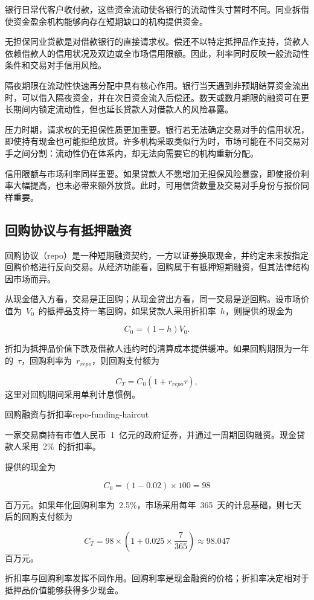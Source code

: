 银行日常代客户收付款，这些资金流动使各银行的流动性头寸暂时不同。同业拆借使资金盈余机构能够向存在短期缺口的机构提供资金。

无担保同业贷款是对借款银行的直接请求权。偿还不以特定抵押品作支持，贷款人依赖借款人的信用状况及双边或全市场信用限额。因此，利率同时反映一般流动性条件和交易对手信用风险。

隔夜期限在流动性快速再分配中具有核心作用。银行当天遇到非预期结算资金流出时，可以借入隔夜资金，并在次日资金流入后偿还。数天或数月期限的融资可在更长期间内锁定流动性，但也延长贷款人对借款人的风险暴露。

压力时期，请求权的无担保性质更加重要。银行若无法确定交易对手的信用状况，即使持有现金也可能拒绝放贷。许多机构采取类似行为时，市场可能在不同交易对手之间分割：流动性仍在体系内，却无法向需要它的机构重新分配。

信用限额与市场利率同样重要。如果贷款人不愿增加无担保风险暴露，即使报价利率大幅提高，也未必带来额外放贷。此时，可用信贷数量及交易对手身份与报价同样重要。

\subsection{回购协议与有抵押融资}

回购协议（repo）是一种短期融资契约，一方以证券换取现金，并约定未来按指定回购价格进行反向交易。从经济功能看，回购属于有抵押短期融资，但其法律结构因市场而异。

从现金借入方看，交易是正回购；从现金贷出方看，同一交易是逆回购。设市场价值为~$V_0$~的抵押品支持一笔回购，如果贷款人采用折扣率~$h$，则提供的现金为

\begin{equation}
C_0=(1-h)V_0.
\label{eq:ch7-repo-cash-haircut}
\end{equation}

折扣为抵押品价值下跌及借款人违约时的清算成本提供缓冲。如果回购期限为一年的~$\tau$，回购利率为~$r_{repo}$，则回购支付额为

\begin{equation}
C_T=C_0(1+r_{repo}\tau),
\label{eq:ch7-repo-repurchase-payment}
\end{equation}
这里对回购期间采用单利计息惯例。

\begin{example}{回购融资与折扣率}{repo-funding-haircut}

一家交易商持有市值人民币~1~亿元的政府证券，并通过一周期回购融资。现金贷款人采用~2\%~的折扣率。

提供的现金为

\[
C_0=(1-0.02)\times100=98
\]

百万元。如果年化回购利率为~2.5\%，市场采用每年~365~天的计息基础，则七天后的回购支付额为

\[
C_T=98\times\left(1+0.025\times\frac{7}{365}\right)
\approx 98.047
\]
百万元。

折扣率与回购利率发挥不同作用。回购利率是现金融资的价格；折扣率决定相对于抵押品价值能够获得多少现金。

\end{example}

